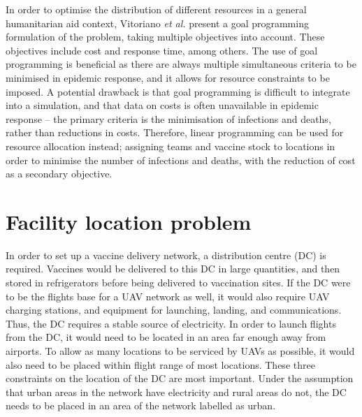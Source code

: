 In order to optimise the distribution of different resources in a general humanitarian aid context, Vitoriano \textit{et al.} \cite{vitoriano2011multi} present a goal programming formulation of the problem, taking multiple objectives into account. These objectives include cost and response time, among others. The use of goal programming is beneficial as there are always multiple simultaneous criteria to be minimised in epidemic response, and it allows for resource constraints to be imposed. A potential drawback is that goal programming is difficult to integrate into a simulation, and that data on costs is often unavailable in epidemic response -- the primary criteria is the minimisation of infections and deaths, rather than reductions in costs. Therefore, linear programming can be used for resource allocation instead; assigning teams and vaccine stock to locations in order to minimise the number of infections and deaths, with the reduction of cost as a secondary objective.

\section{Facility location problem}
\label{sec:lit_facLoc}
In order to set up a vaccine delivery network, a distribution centre (DC) is required. Vaccines would be delivered to this DC in large quantities, and then stored in refrigerators before being delivered to vaccination sites. If the DC were to be the flights base for a UAV network as well, it would also require UAV charging stations, and equipment for launching, landing, and communications. Thus, the DC requires a stable source of electricity. In order to launch flights from the DC, it would need to be located in an area far enough away from airports. To allow as many locations to be serviced by UAVs as possible, it would also need to be placed within flight range of most locations. These three constraints on the location of the DC are most important. Under the assumption that urban areas in the network have electricity and rural areas do not, the DC needs to be placed in an area of the network labelled as urban.


